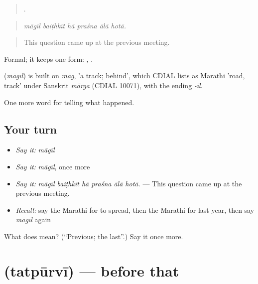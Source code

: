 \begin{quote}
     .
\end{quote}

\begin{quote}
\emph{māgīl baiṭhkīt hā praśna ālā hotā.}
\end{quote}

\begin{quote}
This question came up at the previous meeting.
\end{quote}

Formal; it keeps one form:  ,  .

\begin{cousinweb}
\textbf{} (\emph{māgīl}) is built on \emph{māg}, 'a track; behind', which CDIAL lists as Marathi 'road, track' under Sanskrit \emph{mārga} (CDIAL 10071), with the ending \emph{-īl}.
\end{cousinweb}

\begin{grammarlens}[title={What you've built}]
One more word for telling what happened.
\end{grammarlens}

\subsection*{Your turn}
\begin{itemize}
\raggedright
  \item \emph{Say it:} \emph{māgīl}
  \item \emph{Say it:} \emph{māgīl}, once more
  \item \emph{Say it:} \emph{māgīl baiṭhkīt hā praśna ālā hotā.} — This question came up at the previous meeting.
  \item \emph{Recall:} say the Marathi for to spread, then the Marathi for last year, then say \emph{māgīl} again
\end{itemize}

\begin{tcolorbox}[breakable,colback=teal!4,colframe=teal!35!black,title={Before you move on}]
What does  mean? (\textquotedblleft{}Previous; the last\textquotedblright{}.) Say it once more.
\end{tcolorbox}
\section[\texorpdfstring{\mr{तत्पूर्वी} (tatpūrvī)}{तत्पूर्वी (tatpūrvī)}]{ (tatpūrvī) — before that}

